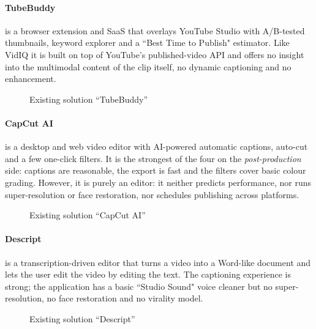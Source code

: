 \paragraph{TubeBuddy} is a browser extension and SaaS that overlays YouTube Studio with
A/B-tested thumbnails, keyword explorer and a ``Best Time to Publish" estimator. Like VidIQ
it is built on top of YouTube's published-video API and offers no insight into the multimodal
content of the clip itself, no dynamic captioning and no enhancement.

\begin{figure}[H]
  \centering
  \caption{Existing solution \textquotedblleft TubeBuddy\textquotedblright}
  \label{fig:tubebuddy}
\end{figure}

\paragraph{CapCut AI} is a desktop and web video editor with AI-powered automatic captions,
auto-cut and a few one-click filters. It is the strongest of the four on the
\emph{post-production} side: captions are reasonable, the export is fast and the filters cover
basic colour grading. However, it is purely an editor: it neither predicts performance, nor
runs super-resolution or face restoration, nor schedules publishing across platforms.

\begin{figure}[H]
  \centering
  \caption{Existing solution \textquotedblleft CapCut AI\textquotedblright}
  \label{fig:capcut}
\end{figure}

\paragraph{Descript} is a transcription-driven editor that turns a video into a Word-like
document and lets the user edit the video by editing the text. The captioning experience is
strong; the application has a basic ``Studio Sound" voice cleaner but no super-resolution, no
face restoration and no virality model.

\begin{figure}[H]
  \centering
  \caption{Existing solution \textquotedblleft Descript\textquotedblright}
  \label{fig:descript}
\end{figure}

